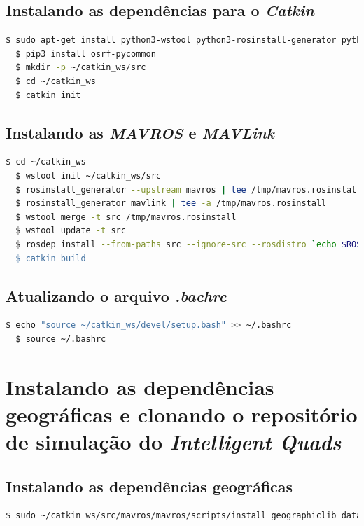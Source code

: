 \documentclass[12pt,a4paper,oneside]{book}
\begin{document}
\subsection{Instalando as dependências para o \textit{Catkin}}
\begin{lstlisting}[language=bash] 
  $ sudo apt-get install python3-wstool python3-rosinstall-generator python3-catkin-lint python3-pip python3-catkin-tools
  $ pip3 install osrf-pycommon
  $ mkdir -p ~/catkin_ws/src
  $ cd ~/catkin_ws
  $ catkin init
\end{lstlisting}

\subsection{Instalando as \textit{MAVROS} e \textit{MAVLink}}
\begin{lstlisting}[language=bash] 
  $ cd ~/catkin_ws
  $ wstool init ~/catkin_ws/src
  $ rosinstall_generator --upstream mavros | tee /tmp/mavros.rosinstall
  $ rosinstall_generator mavlink | tee -a /tmp/mavros.rosinstall
  $ wstool merge -t src /tmp/mavros.rosinstall
  $ wstool update -t src
  $ rosdep install --from-paths src --ignore-src --rosdistro `echo $ROS_DISTRO' -y
  $ catkin build
\end{lstlisting}

\subsection{Atualizando o arquivo \textit{.bachrc}}
\begin{lstlisting}[language=bash] 
  $ echo "source ~/catkin_ws/devel/setup.bash" >> ~/.bashrc
  $ source ~/.bashrc
\end{lstlisting}

\section{Instalando as dependências geográficas e clonando o repositório de simulação do \textit{Intelligent Quads}}

\subsection{Instalando as dependências geográficas}
\begin{lstlisting}[language=bash] 
  $ sudo ~/catkin_ws/src/mavros/mavros/scripts/install_geographiclib_datasets.sh]
\end{lstlisting}
\end{document}
